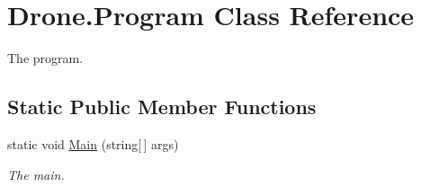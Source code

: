 \hypertarget{class_drone_1_1_program}{}\section{Drone.\+Program Class Reference}
\label{class_drone_1_1_program}


The program.  


\subsection*{Static Public Member Functions}
\begin{DoxyCompactItemize}
\item 
static void \hyperlink{class_drone_1_1_program_a5fdbe9a7bf4701070bdf70bb7392f1e7}{Main} (string\mbox{[}$\,$\mbox{]} args)
\begin{DoxyCompactList}\small\item\em The main. \end{DoxyCompactList}\end{DoxyCompactItemize}
